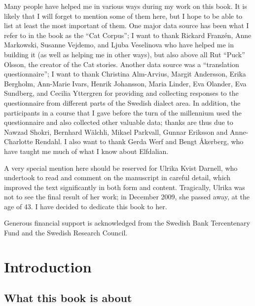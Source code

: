 \begin{styleBodytextC}
Many people have helped me in various ways during my work on this book. It is likely that I will forget to mention some of them here, but I hope to be able to list at least the most important of them. One major data source has been what I refer to in the book as the “Cat Corpus”; I want to thank Rickard Franzén, Anne Markowski, Susanne Vejdemo, and Ljuba Veselinova who have helped me in building it (as well as helping me in other ways), but also above all Rut “Puck” Olsson, the creator of the Cat stories. Another data source was a “translation questionnaire”; I want to thank Christina Alm-Arvius, Margit Andersson, Erika Bergholm, Ann-Marie Ivars, Henrik Johansson, Maria Linder, Eva Olander, Eva Sundberg, and Cecilia Yttergren for providing and collecting responses to the questionnaire from different parts of the Swedish dialect area. In addition, the participants in a course that I gave before the turn of the millennium used the questionnaire and also collected other valuable data; thanks are thus due to Nawzad Shokri, Bernhard Wälchli, Mikael Parkvall, Gunnar Eriksson and Anne-Charlotte Rendahl. I also want to thank Gerda Werf and Bengt Åkerberg, who have taught me much of what I know about Elfdalian. 

\end{styleBodytextC}

\begin{styleBodytextC}
A very special mention here should be reserved for Ulrika Kvist Darnell, who undertook to read and comment on the manuscript in careful detail, which improved the text significantly in both form and content. Tragically, Ulrika was not to see the final result of her work; in December 2009, she passed away, at the age of 43. I have decided to dedicate this book to her. 

\end{styleBodytextC}

\begin{styleBodytextC}
Generous financial support is acknowledged from the Swedish Bank Tercentenary Fund and the Swedish Research Council.

\end{styleBodytextC}

\chapter[Introduction]{Introduction}
\section{What this book is about}


